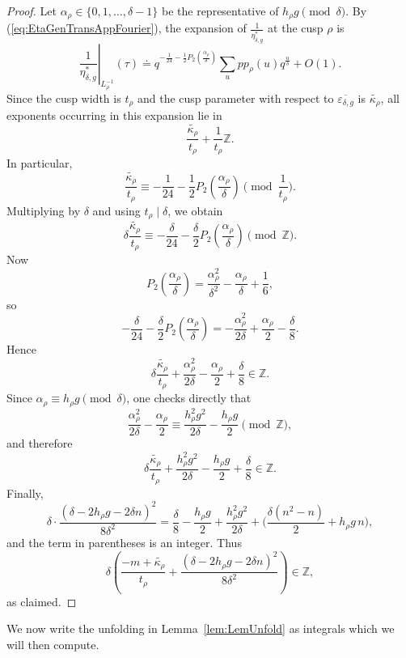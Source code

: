 \documentclass[10pt]{amsart}
\theoremstyle{definition}
\theoremstyle{remark}
\numberwithin{equation}{section}
\begin{document}
	\begin{proof}
		Let $\alpha_\rho\in\{0,1,\dots,\delta-1\}$ be the representative of $h_\rho g \pmod{\delta}$.
		By (\ref{eq:EtaGenTransAppFourier}), the expansion of $\frac{1}{\eta_{\delta,g}^\ast}$ at the cusp $\rho$ is
		\[
		\left.\frac{1}{\eta^*_{\delta,g}}\right|_{L_\rho^{-1}}(\tau)
		\doteq
		q^{-\frac1{24}-\frac12P_2(\frac{\alpha_\rho}{\delta})}
		\sum_{u} pp_\rho(u) q^{\frac{u}{\delta}} + O(1).
		\]
		Since the cusp width is $t_\rho$ and the cusp parameter with respect to $\overline{\varepsilon_{\delta,g}}$ is $\widetilde{\kappa_\rho}$, all exponents occurring in this expansion lie in
		\[
		\frac{\widetilde{\kappa_\rho}}{t_\rho}+\frac{1}{t_\rho}\mathbb Z.
		\]
		In particular,
		\[
		\frac{\widetilde{\kappa_\rho}}{t_\rho}\equiv
		-\frac1{24}-\frac12P_2\!\left(\frac{\alpha_\rho}{\delta}\right)
		\pmod{\frac1{t_\rho}}.
		\]
		Multiplying by $\delta$ and using $t_\rho\mid \delta$, we obtain
		\[
		\delta\frac{\widetilde{\kappa_\rho}}{t_\rho}\equiv
		-\frac{\delta}{24}-\frac{\delta}{2}P_2\!\left(\frac{\alpha_\rho}{\delta}\right)
		\pmod{\mathbb Z}.
		\]
		Now
		\[
		P_2\!\left(\frac{\alpha_\rho}{\delta}\right)
		=\frac{\alpha_\rho^2}{\delta^2}-\frac{\alpha_\rho}{\delta}+\frac16,
		\]
		so
		\[
		-\frac{\delta}{24}-\frac{\delta}{2}P_2\!\left(\frac{\alpha_\rho}{\delta}\right)
		=
		-\frac{\alpha_\rho^2}{2\delta}+\frac{\alpha_\rho}{2}-\frac{\delta}{8}.
		\]
		Hence
		\[
		\delta\frac{\widetilde{\kappa_\rho}}{t_\rho}
		+\frac{\alpha_\rho^2}{2\delta}-\frac{\alpha_\rho}{2}+\frac{\delta}{8}\in \mathbb Z.
		\]
		Since $\alpha_\rho\equiv h_\rho g \pmod{\delta}$, one checks directly that
		\[
		\frac{\alpha_\rho^2}{2\delta}-\frac{\alpha_\rho}{2}
		\equiv
		\frac{h_\rho^2g^2}{2\delta}-\frac{h_\rho g}{2}
		\pmod{\mathbb Z},
		\]
		and therefore
		\[
		\delta\frac{\widetilde{\kappa_\rho}}{t_\rho}
		+\frac{h_\rho^2g^2}{2\delta}-\frac{h_\rho g}{2}+\frac{\delta}{8}\in \mathbb Z.
		\]
		Finally,
		\[
		\delta\cdot \frac{(\delta-2h_\rho g-2\delta n)^2}{8\delta^2}
		=
		\frac{\delta}{8}-\frac{h_\rho g}{2}+\frac{h_\rho^2g^2}{2\delta}
		+\bigg(\frac{\delta(n^2-n)}{2}+h_\rho g\,n\bigg),
		\]
		and the term in parentheses is an integer. Thus
		\[
		\delta\left(\frac{-m+\widetilde{\kappa_\rho}}{t_\rho}+
		\frac{(\delta-2h_\rho g-2\delta n)^2}{8\delta^2}\right)\in \mathbb Z,
		\]
		as claimed.
	\end{proof}
	
	We now write the unfolding in Lemma~\ref{lem:LemUnfold} as integrals which we will then compute.
	
\end{document}
